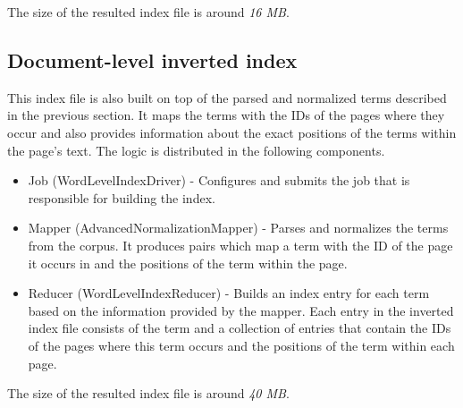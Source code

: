 \documentclass[a4paper, notitlepage]{report}
\begin{document}
The size of the resulted index file is around \emph{16 MB}.
\subsection{Document-level inverted index}
This index file is also built on top of the parsed and normalized terms described in the previous section. It maps the terms with the IDs of the pages where they occur and also provides information about the exact positions of the terms within the page's text. The logic is distributed in the following components.

\begin{itemize}
	\item Job (WordLevelIndexDriver) - Configures and submits the job that is responsible for building the index.
	\item Mapper (AdvancedNormalizationMapper) - Parses and normalizes the terms from the corpus. It produces pairs which map a term with the ID of the page it occurs in and the positions of the term within the page.
	\item Reducer (WordLevelIndexReducer) - Builds an index entry for each term based on the information provided by the mapper. Each entry in the inverted index file consists of the term and a collection of entries that contain the IDs of the pages where this term occurs and the positions of the term within each page.  
\end{itemize}

The size of the resulted index file is around \emph{40 MB}.
\end{document}
